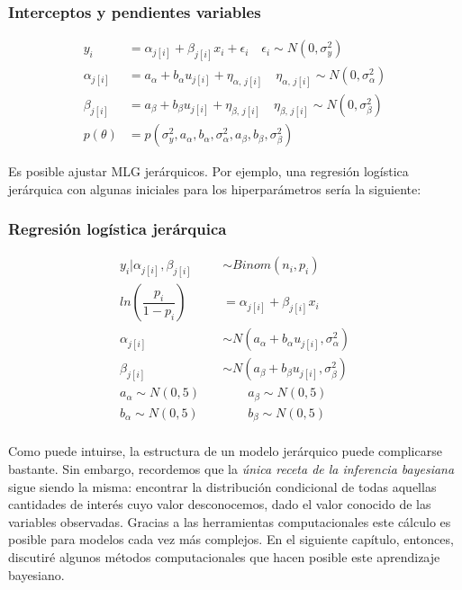 \subsubsection*{Interceptos y pendientes variables}
\begin{align*}
y_i &= \alpha_{j[i]} + \beta_{j[i]} x_i + \epsilon_i  \quad \epsilon_i  \sim N(0,\sigma_y^2) \\
\alpha_{j[i]} &= a_{\alpha} + b_{\alpha} u_{j[i]} + \eta_{\alpha,\,j[i]} \quad \eta_{\alpha,\,j[i]}  \sim N(0, \sigma_{\alpha}^2) \\ 
\beta_{j[i]} &= a_{\beta} + b_{\beta} u_{j[i]} + \eta_{\beta,\,j[i]} \quad \eta_{\beta,\,j[i]}  \sim N(0, \sigma_{\beta}^2) \\ 
p(\theta) &= p(\sigma_y^2,a_{\alpha},b_{\alpha},\sigma_{\alpha}^2,a_{\beta},b_{\beta},\sigma_{\beta}^2)
\end{align*}

Es posible ajustar MLG jerárquicos. Por ejemplo, una regresión logística jerárquica con algunas iniciales para los hiperparámetros sería la siguiente: 

\subsubsection*{Regresión logística jerárquica}
\begin{align*}
y_i|\alpha_{j[i]},\beta_{j[i]} & \sim Binom(n_i,p_i) \\
ln\left(\dfrac{p_i}{1-p_i}\right) &= \alpha_{j[i]} + \beta_{j[i]} x_i  \\ 
\alpha_{j[i]} & \sim N(a_{\alpha} + b_{\alpha} u_{j[i]}, \sigma_{\alpha}^2) \\ 
\beta_{j[i]} & \sim N(a_{\beta} + b_{\beta} u_{j[i]}, \sigma_{\beta}^2) \\ 
a_{\alpha} \sim N(0,5) \quad & \qquad a_{\beta} \sim N(0,5) \\
b_{\alpha} \sim N(0,5) \quad & \qquad b_{\beta} \sim N(0,5) \\
\end{align*}

Como puede intuirse, la estructura de un modelo jerárquico puede complicarse bastante. Sin embargo, recordemos que la \textit{única receta de la inferencia bayesiana} sigue siendo la misma: encontrar la distribución condicional de todas aquellas cantidades de interés cuyo valor desconocemos, dado el valor conocido de las variables observadas. Gracias a las herramientas computacionales este cálculo es posible para modelos cada vez más complejos. En el siguiente capítulo, entonces, discutiré algunos métodos computacionales que hacen posible este aprendizaje bayesiano. 
